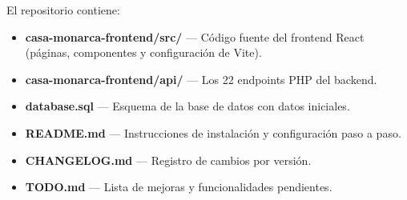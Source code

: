 \documentclass[10pt,letterpaper]{report}
\begin{document}
El repositorio contiene:

\begin{itemize}
  \item \textbf{casa-monarca-frontend/src/} — Código fuente del frontend React (páginas, componentes y configuración de Vite).
  \item \textbf{casa-monarca-frontend/api/} — Los 22 endpoints PHP del backend.
  \item \textbf{database.sql} — Esquema de la base de datos con datos iniciales.
  \item \textbf{README.md} — Instrucciones de instalación y configuración paso a paso.
  \item \textbf{CHANGELOG.md} — Registro de cambios por versión.
  \item \textbf{TODO.md} — Lista de mejoras y funcionalidades pendientes.
\end{itemize}
\end{document}
